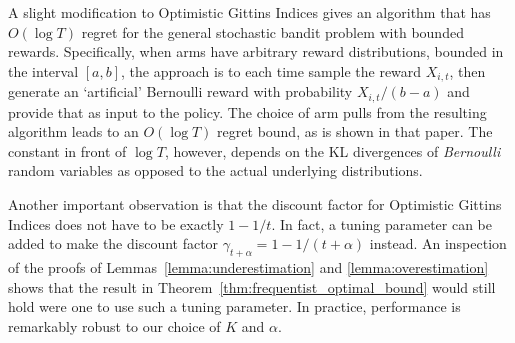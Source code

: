 A slight modification to Optimistic Gittins Indices gives an algorithm that has $O(\log T)$ regret for the general stochastic bandit problem with bounded rewards. Specifically, when arms have arbitrary reward distributions, bounded in the interval $[a,b]$, the approach is to each time sample the reward $X_{i,t}$, then generate an `artificial' Bernoulli reward with probability $X_{i,t}/(b-a)$ and provide that as input to the policy. The choice of arm pulls from the resulting algorithm leads to an $O(\log T)$ regret bound, as is shown in that paper. The constant in front of $\log T$, however, depends on the KL divergences of \emph{Bernoulli} random variables as opposed to the actual underlying distributions.

Another important observation is that the discount factor for Optimistic Gittins Indices does not have to be exactly $1-1/t$. In fact, a tuning parameter can be added to make the discount factor $\gamma_{t+\alpha} = 1-1/(t+\alpha)$ instead. An inspection of the proofs of Lemmas~\ref{lemma:underestimation} and \ref{lemma:overestimation} shows that the result in Theorem~\ref{thm:frequentist_optimal_bound} would still hold were one to use such a tuning parameter. In practice, performance is remarkably robust to our choice of $K$ and $\alpha$.